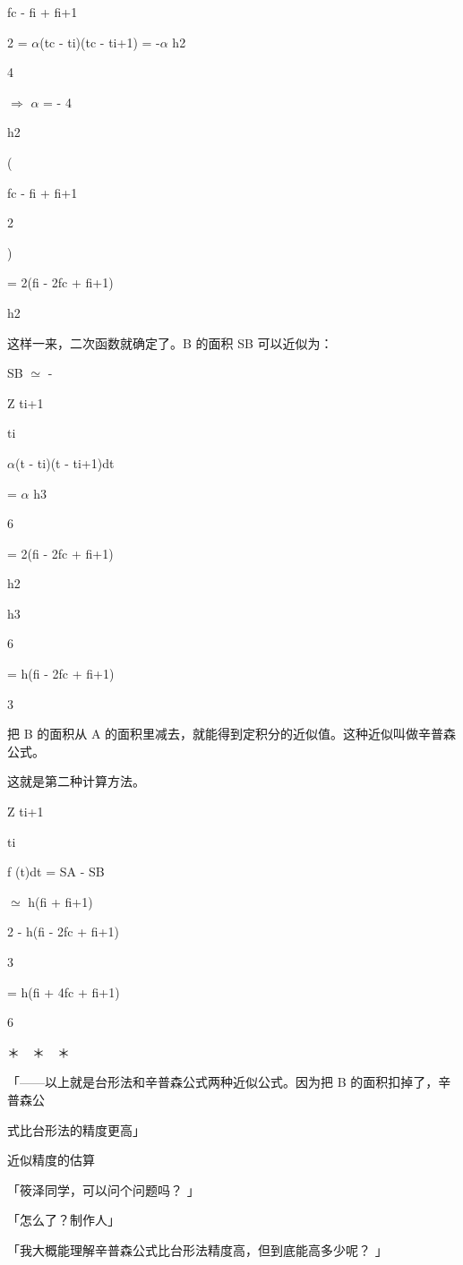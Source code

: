 fc - fi + fi+1\par
2 = $\alpha$(tc - ti)(tc - ti+1) = -$\alpha$ h2\par
4\par
$\Rightarrow$ $\alpha$ = - 4\par
h2\par
(\par
fc - fi + fi+1\par
2\par
)\par
= 2(fi - 2fc + fi+1)\par
h2\par
这样一来，二次函数就确定了。B 的面积 SB 可以近似为：\par
SB $\simeq$ -\par
Z ti+1\par
ti\par
$\alpha$(t - ti)(t - ti+1)dt\par
= $\alpha$ h3\par
6\par
= 2(fi - 2fc + fi+1)\par
h2\par
h3\par
6\par
= h(fi - 2fc + fi+1)\par
3\par
把 B 的面积从 A 的面积里减去，就能得到定积分的近似值。这种近似叫做辛普森公式。\par
这就是第二种计算方法。\par
Z ti+1\par
ti\par
f (t)dt = SA - SB\par
$\simeq$ h(fi + fi+1)\par
2 - h(fi - 2fc + fi+1)\par
3\par
= h(fi + 4fc + fi+1)\par
6\par
＊　＊　＊\par
「——以上就是台形法和辛普森公式两种近似公式。因为把 B 的面积扣掉了，辛普森公\par
式比台形法的精度更高」\par
近似精度的估算\par
「筱泽同学，可以问个问题吗？ 」\par
「怎么了？制作人」\par
「我大概能理解辛普森公式比台形法精度高，但到底能高多少呢？ 」\par

